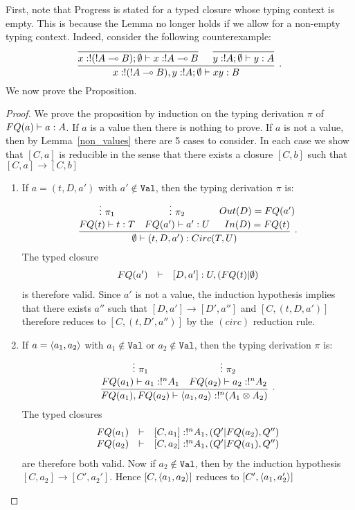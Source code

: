 \documentclass{article}
\begin{document}
First, note that Progress is stated for a typed closure whose typing 
context is empty. This is because the Lemma no longer holds if we allow 
for a non-empty typing context. Indeed, consider the following counterexample:
\[
\infer[.]{x:!(!A\loli B), y:!A;\emptyset\entails xy:B}{
 \infer[]{x:!(!A\loli B);\emptyset\entails x:!A\loli B}{ 
 }
 &
 \infer[]{y:!A;\emptyset\entails y:A}{ 
 }
}
\]
We now prove the Proposition.

\begin{proof}
We prove the proposition by induction on the typing derivation $\pi$ of 
$FQ(a)\vdash a:A$. If $a$ is a value then there is nothing 
to prove. If $a$ is not a value, then by 
Lemma~\hyperref[non_values]{\ref*{non_values}} there are 5 cases to consider. 
In each case we show that $[C,a]$ is reducible in the sense that there exists a 
closure  $[C,b]$ such that $[C,a]\to[C,b]$
\begin{enumerate}
  \item If $a=(t,D,a')$ with $a'\notin \mathtt{Val}$, then the typing derivation 
  $\pi$ is:
  \[
  \infer[.]{\emptyset\entails (t,D,a'):Circ(T,U)}{
    \deduce[]{FQ(t)\entails t:T}{
      \vdots ~\pi_1
    }
    &
    \deduce[]{FQ(a')\entails a':U}{
      \vdots ~\pi_2     
    }
    &
    \deduce[]{In(D)=FQ(t)}{
      Out(D)=FQ(a')
    }
  }   
  \]
  The typed closure 
  \[
  \begin{array}{rcl}
  FQ(a') & \vdash & [D,a']:U,(FQ(t)|\emptyset)
  \end{array}
  \]
  is therefore valid. Since $a'$ 
  is not a value, the induction hypothesis implies that there exists $a''$ such 
  that $[D,a']\to [D',a'']$ and $[C,(t,D,a')]$ therefore reduces to 
  $[C,(t,D',a'')]$ by the $(circ)$ reduction rule.
  \item If $a=\langle a_1,a_2\rangle$ with $a_1\notin \mathtt{Val}$ or $a_2\notin \mathtt{Val}$,
  then the typing derivation $\pi$ is:
  \[
  \infer[.]{FQ(a_1),FQ(a_2)\entails \p{a_1,a_2}:!^n(A_1\x A_2)}{
    \deduce[]{FQ(a_1)\entails a_1:!^nA_1}{
      \vdots~\pi_1
    }
    & 
    \deduce[]{FQ(a_2)\entails a_2:!^nA_2}{
      \vdots~\pi_2
    }
  }
  \] 
  The typed closures 
  \[
  \begin{array}{rcl}
  FQ(a_1) & \vdash & [C,a_1]:!^nA_1,(Q'|FQ(a_2),Q'')\\
  FQ(a_2) & \vdash & [C,a_2]:!^nA_1, (Q'|FQ(a_1),Q'')
  \end{array}
  \]
  are therefore both valid. 
  Now if $a_2\notin\mathtt{Val}$, then by the induction hypothesis 
  $[C,a_2]\to[C',a_2']$. Hence $[C,\langle a_1,a_2\rangle]$ reduces to $[C',\langle a_1,a_2'\rangle]$ 

\end{enumerate}
\end{proof}
\end{document}
